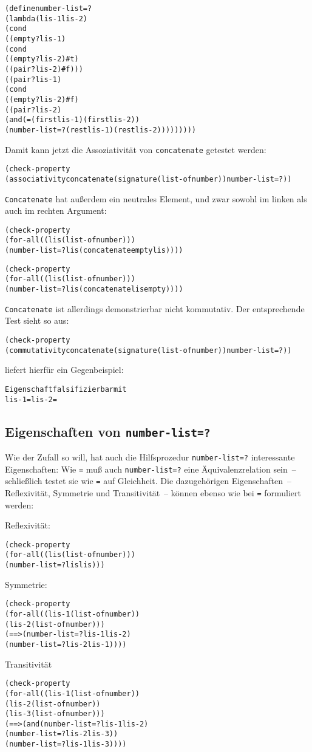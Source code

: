 %
\begin{alltt}
(define number-list=?
  (lambda (lis-1 lis-2)
    (cond
      ((empty? lis-1)
       (cond
         ((empty? lis-2) #t)
         ((pair? lis-2) #f)))
      ((pair? lis-1)
       (cond
         ((empty? lis-2) #f)
         ((pair? lis-2)
          (and (= (first lis-1) (first lis-2))
               (number-list=? (rest lis-1) (rest lis-2)))))))))
\end{alltt}
%
Damit kann jetzt die Assoziativität von \texttt{concatenate} getestet werden:
%
\begin{alltt}
(check-property
 (associativity concatenate (signature (list-of number)) number-list=?))
\end{alltt}
%
\texttt{Concatenate} hat außerdem ein neutrales Element, und zwar
sowohl im linken als auch im rechten Argument:
%
\begin{alltt}
(check-property
 (for-all ((lis (list-of number)))
   (number-list=? lis (concatenate empty lis))))

(check-property
 (for-all ((lis (list-of number)))
   (number-list=? lis (concatenate lis empty))))
\end{alltt}
%
\texttt{Concatenate} ist allerdings demonstrierbar nicht kommutativ.
Der entsprechende Test sieht so aus:
%
\begin{alltt}
(check-property
 (commutativity concatenate (signature (list-of number)) number-list=?))
\end{alltt}
%
\drscheme{} liefert hierfür ein Gegenbeispiel:
%
\begin{alltt}
Eigenschaft falsifizierbar mit
         lis-1 =  lis-2 = 
\end{alltt}

\subsection{Eigenschaften von \texttt{number-list=?}}

Wie der Zufall so will, hat auch die Hilfsprozedur
\texttt{number-list=?} interessante Eigenschaften: Wie \texttt{=} muß
auch \texttt{number-list=?} eine Äquivalenzrelation sein~--
schließlich testet sie wie \texttt{=} auf Gleichheit.  Die
dazugehörigen Eigenschaften~-- Reflexivität, Symmetrie und
Transitivität~-- können ebenso wie bei \texttt{=} formuliert werden:

Reflexivität:
%
\begin{alltt}
(check-property
 (for-all ((lis (list-of number)))
   (number-list=? lis lis)))
\end{alltt}
Symmetrie:
\begin{alltt}
(check-property
  (for-all ((lis-1 (list-of number))
            (lis-2 (list-of number)))
    (==> (number-list=? lis-1 lis-2)
         (number-list=? lis-2 lis-1))))
\end{alltt}
 Transitivität
\begin{alltt}
(check-property
 (for-all ((lis-1 (list-of number))
           (lis-2 (list-of number))
           (lis-3 (list-of number)))
   (==> (and (number-list=? lis-1 lis-2)
             (number-list=? lis-2 lis-3))
        (number-list=? lis-1 lis-3))))
\end{alltt}
%

